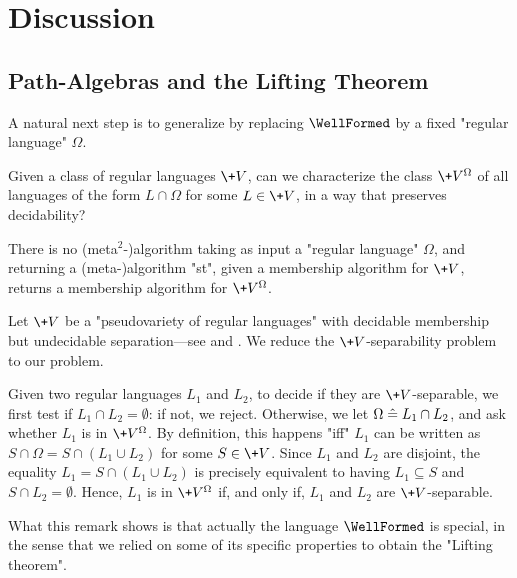 \section{Discussion}
\label{sec:algebra-discussion}

\subsection{Path-Algebras and the Lifting Theorem}

A natural next step is to generalize  by replacing
$\WellFormed$ by a fixed "regular language" $\Omega$.

\begin{question}
	Given a class of regular languages $\+V$, can we characterize the class $\+V^\Omega$
	of all languages of the form $L \cap \Omega$ for some $L \in \+V$, in a way that preserves decidability?
\end{question}

\begin{remark}
	\label{rk:no-algo-lifting}
	There is no (meta$^2$-)algorithm taking as input a "regular language" $\Omega$,
	and returning a (meta-)algorithm "st", given
	a membership algorithm for $\+V$, returns a membership algorithm
	for $\+V^\Omega$.

	Let $\+V$ be a "pseudovariety of regular languages" with
	decidable membership but undecidable separation---see
	\cite[Corollary 1.6, p.~478]{Rhode2011Pointlike} and .
	We reduce the $\+V$-separability problem to our problem.

	Given two regular languages $L_1$ and $L_2$, to decide if they are $\+V$-separable,
	we first test if $L_1 \cap L_2 = \emptyset$: if not, we reject.
	Otherwise, we let $\Omega \mathrel{\hat{=}} L_1 \cap L_2$, and ask whether
	$L_1$ is in $\+V^\Omega$.
	By definition, this happens "iff" $L_1$ can be written as
	$S \cap \Omega = S \cap (L_1 \cup L_2)$ for some $S \in \+V$.
	Since $L_1$ and $L_2$ are disjoint, the equality $L_1 = S \cap (L_1 \cup L_2)$
	is precisely equivalent to having $L_1 \subseteq S$ and $S \cap L_2 = \emptyset$.
	Hence, $L_1$ is in $\+V^\Omega$ if, and only if, $L_1$ and $L_2$ are $\+V$-separable.
\end{remark}

What this remark shows is that actually the language $\WellFormed$ is special,
in the sense that we relied on some of its specific properties to obtain the "Lifting theorem".


